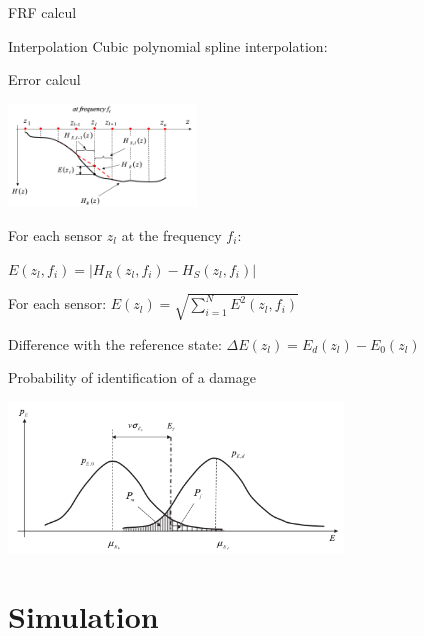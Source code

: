 \documentclass{beamer}
\begin{document}
\begin{frame}{FRF calcul}
\end{frame}

\begin{frame}{Interpolation}
Cubic polynomial spline interpolation:



\end{frame}


\begin{frame}{Error calcul}

\begin{center}
\includegraphics[width=5cm]{images/interpolation.png}
\end{center}

For each sensor $z_l$ at the frequency $f_i$:
\begin{center}
$E(z_l,f_i) = | H_R(z_l,f_i) - H_S(z_l,f_i) |$
\end{center}


For each sensor:
$E(z_l) = \sqrt{  \sum\limits_{i=1}^N  E^2(z_l,f_i) }$


Difference with the reference state:
$\Delta E(z_l) = E_d(z_l) - E_0(z_l)$

\end{frame}

\begin{frame}{Probability of identification of a damage}
\begin{center}
\includegraphics[height=4cm]{images/gaussiennes.png}
\end{center}
\end{frame}


\section{Simulation}
\end{document}
